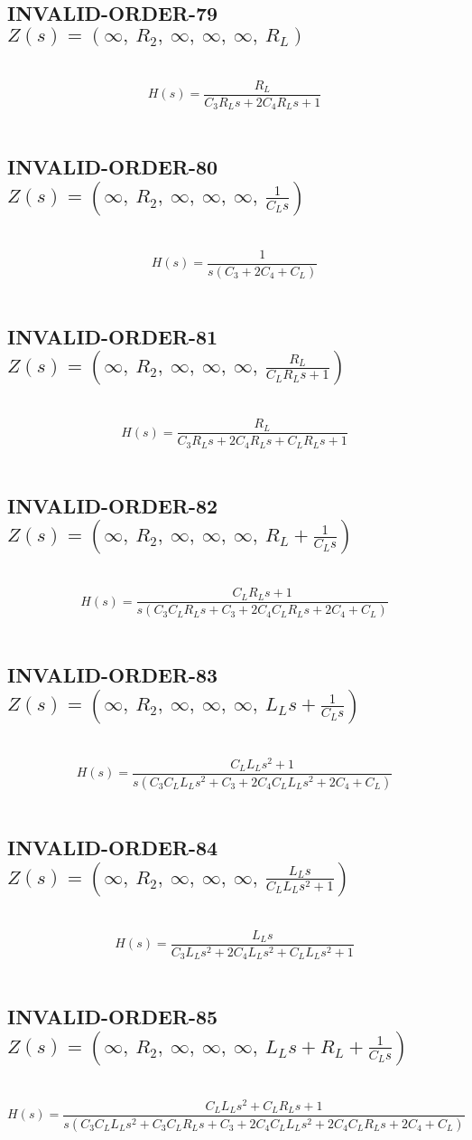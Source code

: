 \documentclass{article}
\begin{document}
\subsection{INVALID-ORDER-79 $Z(s) = \left( \infty, \  R_{2}, \  \infty, \  \infty, \  \infty, \  R_{L}\right)$ } \ 
\textbf{\[H(s) = \frac{R_{L}}{C_{3} R_{L} s + 2 C_{4} R_{L} s + 1}\] } \ 
\subsection{INVALID-ORDER-80 $Z(s) = \left( \infty, \  R_{2}, \  \infty, \  \infty, \  \infty, \  \frac{1}{C_{L} s}\right)$ } \ 
\textbf{\[H(s) = \frac{1}{s \left(C_{3} + 2 C_{4} + C_{L}\right)}\] } \ 
\subsection{INVALID-ORDER-81 $Z(s) = \left( \infty, \  R_{2}, \  \infty, \  \infty, \  \infty, \  \frac{R_{L}}{C_{L} R_{L} s + 1}\right)$ } \ 
\textbf{\[H(s) = \frac{R_{L}}{C_{3} R_{L} s + 2 C_{4} R_{L} s + C_{L} R_{L} s + 1}\] } \ 
\subsection{INVALID-ORDER-82 $Z(s) = \left( \infty, \  R_{2}, \  \infty, \  \infty, \  \infty, \  R_{L} + \frac{1}{C_{L} s}\right)$ } \ 
\textbf{\[H(s) = \frac{C_{L} R_{L} s + 1}{s \left(C_{3} C_{L} R_{L} s + C_{3} + 2 C_{4} C_{L} R_{L} s + 2 C_{4} + C_{L}\right)}\] } \ 
\subsection{INVALID-ORDER-83 $Z(s) = \left( \infty, \  R_{2}, \  \infty, \  \infty, \  \infty, \  L_{L} s + \frac{1}{C_{L} s}\right)$ } \ 
\textbf{\[H(s) = \frac{C_{L} L_{L} s^{2} + 1}{s \left(C_{3} C_{L} L_{L} s^{2} + C_{3} + 2 C_{4} C_{L} L_{L} s^{2} + 2 C_{4} + C_{L}\right)}\] } \ 
\subsection{INVALID-ORDER-84 $Z(s) = \left( \infty, \  R_{2}, \  \infty, \  \infty, \  \infty, \  \frac{L_{L} s}{C_{L} L_{L} s^{2} + 1}\right)$ } \ 
\textbf{\[H(s) = \frac{L_{L} s}{C_{3} L_{L} s^{2} + 2 C_{4} L_{L} s^{2} + C_{L} L_{L} s^{2} + 1}\] } \ 
\subsection{INVALID-ORDER-85 $Z(s) = \left( \infty, \  R_{2}, \  \infty, \  \infty, \  \infty, \  L_{L} s + R_{L} + \frac{1}{C_{L} s}\right)$ } \ 
\textbf{\[H(s) = \frac{C_{L} L_{L} s^{2} + C_{L} R_{L} s + 1}{s \left(C_{3} C_{L} L_{L} s^{2} + C_{3} C_{L} R_{L} s + C_{3} + 2 C_{4} C_{L} L_{L} s^{2} + 2 C_{4} C_{L} R_{L} s + 2 C_{4} + C_{L}\right)}\] } \ 
\end{document}
